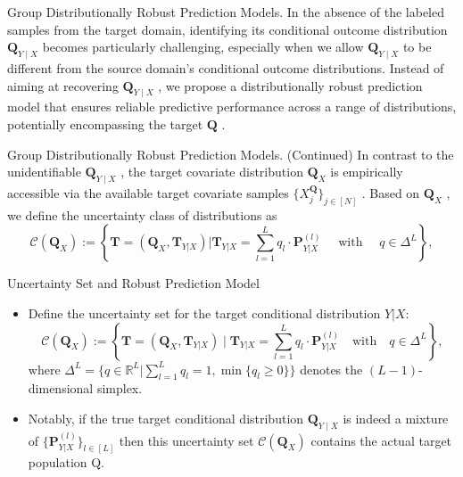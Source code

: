 \documentclass{beamer}
\begin{document}
\begin{frame}{Group Distributionally Robust Prediction Models.}
    In the absence of the labeled samples from the target domain, identifying its conditional outcome distribution $\mathbf { Q } _ { Y \mid X }$ becomes particularly challenging, especially when we allow $\mathbf { Q } _ { Y \mid X }$ to be different from the source domain’s conditional outcome distributions. Instead of aiming at recovering $\mathbf { Q } _ { Y \mid X }$ , we propose a distributionally robust prediction model that ensures reliable predictive performance across a range of distributions, potentially encompassing the target $\mathbf { Q }$ .
\end{frame}

\begin{frame}{Group Distributionally Robust Prediction Models. (Continued)}
    In contrast to the unidentifiable $\mathbf { Q } _ { Y \mid X }$ , the target covariate distribution $\mathbf { Q } _ { X }$ is empirically accessible via the available target covariate samples $\{ X _ { j } ^ { \mathbf { Q } } \} _ { j \in [ N ] }$ . Based on $\mathbf { Q } _ { X }$ , we define the uncertainty class of distributions as
    \begin{equation*}
        \mathcal {C} (\mathbf {Q} _ {X}) := \left\{\mathbf {T} = (\mathbf {Q} _ {X}, \mathbf {T} _ {Y | X})   \big |   \mathbf {T} _ {Y | X} = \sum_ {l = 1} ^ {L} q _ {l} \cdot \mathbf {P} _ {Y | X} ^ {(l)} \quad \text { with } \quad q \in \Delta^ {L} \right\}, \tag {2.1}
    \end{equation*}
\end{frame}
\begin{frame}{Uncertainty Set and Robust Prediction Model}
    \begin{itemize}
        \item Define the uncertainty set for the target conditional distribution $Y|X$:
        \[
        \mathcal{C}(\mathbf{Q}_X) := \left\{\mathbf{T} = (\mathbf{Q}_X, \mathbf{T}_{Y|X}) \mid \mathbf{T}_{Y|X} = \sum_{l=1}^{L} q_l \cdot \mathbf{P}_{Y|X}^{(l)} \quad \text{with} \quad q \in \Delta^{L} \right\},
        \]
        where $\Delta^{L} = \{ q \in \mathbb{R}^{L} | \sum_{l=1}^{L} q_l = 1, \min\{ q_l \geq 0 \} \}$ denotes the $(L-1)$-dimensional simplex.
        \item Notably, if the true target conditional distribution $\mathbf{Q}_{Y \mid X}$ is indeed a mixture of $\{ \mathbf{P}_{Y|X}^{(l)} \}_{l \in [L]}$ then this uncertainty set $\mathcal{C}( \mathbf{Q}_{X} )$ contains the actual target population Q.
    \end{itemize}
\end{frame}
\end{document}
